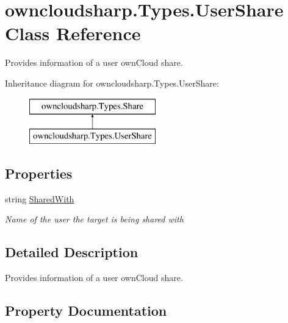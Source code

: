 \hypertarget{classowncloudsharp_1_1_types_1_1_user_share}{}\section{owncloudsharp.\+Types.\+User\+Share Class Reference}
\label{classowncloudsharp_1_1_types_1_1_user_share}


Provides information of a user own\+Cloud share.  


Inheritance diagram for owncloudsharp.\+Types.\+User\+Share\+:\begin{figure}[H]
\begin{center}
\leavevmode
\includegraphics[height=2.000000cm]{classowncloudsharp_1_1_types_1_1_user_share}
\end{center}
\end{figure}
\subsection*{Properties}
\begin{DoxyCompactItemize}
\item 
string \hyperlink{classowncloudsharp_1_1_types_1_1_user_share_a1d253a1b33f697479bf7a14f4b78bb4e}{Shared\+With}
\begin{DoxyCompactList}\small\item\em Name of the user the target is being shared with \end{DoxyCompactList}\end{DoxyCompactItemize}


\subsection{Detailed Description}
Provides information of a user own\+Cloud share. 



\subsection{Property Documentation}
\hypertarget{classowncloudsharp_1_1_types_1_1_user_share_a1d253a1b33f697479bf7a14f4b78bb4e}{}
